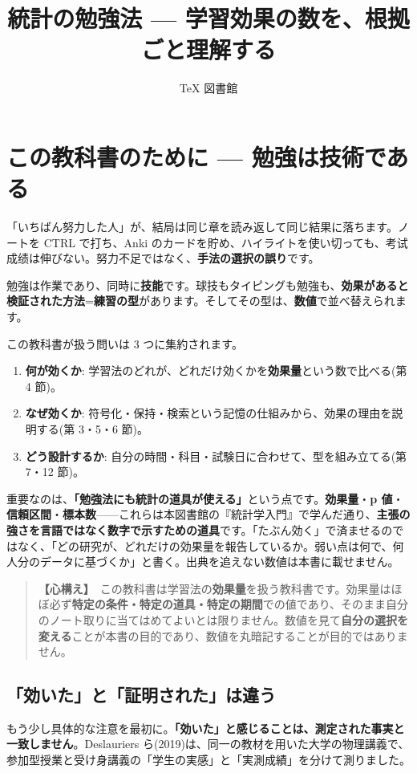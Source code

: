 \documentclass{article}
\title{統計の勉強法 — 学習効果の数を、根拠ごと理解する}
\author{TeX 図書館}
\begin{document}
\section{この教科書のために — 勉強は技術である}

「いちばん努力した人」が、結局は同じ章を読み返して同じ結果に落ちます。ノートを CTRL で打ち、Anki のカードを貯め、ハイライトを使い切っても、考试成绩は伸びない。努力不足ではなく、\textbf{手法の選択の誤り}です。

勉強は作業であり、同時に\textbf{技能}です。球技もタイピングも勉強も、\textbf{効果があると検証された方法}=\textbf{練習の型}があります。そしてその型は、\textbf{数値}で並べ替えられます。

この教科書が扱う問いは 3 つに集約されます。

\begin{enumerate}
\item \textbf{何が効くか}: 学習法のどれが、どれだけ効くかを\textbf{効果量}という数で比べる(第 4 節)。
\item \textbf{なぜ効くか}: 符号化・保持・検索という記憶の仕組みから、効果の理由を説明する(第 3・5・6 節)。
\item \textbf{どう設計するか}: 自分の時間・科目・試験日に合わせて、型を組み立てる(第 7・12 節)。
\end{enumerate}

重要なのは、\textbf{「勉強法にも統計の道具が使える」}という点です。\textbf{効果量}・\textbf{p 値}・\textbf{信頼区間}・\textbf{標本数}——これらは本図書館の『統計学入門』で学んだ通り、\textbf{主張の強さを言語ではなく数字で示すための道具}です。「たぶん効く」で済ませるのではなく、「どの研究が、どれだけの効果量を報告しているか。弱い点は何で、何人分のデータに基づくか」と書く。出典を追えない数値は本書に載せません。

\begin{quote}
\textbf{【心構え】}\ この教科書は学習法の\textbf{効果量}を扱う教科書です。効果量はほぼ必ず\textbf{特定の条件・特定の道具・特定の期間}での値であり、そのまま自分のノート取りに当てはめてよいとは限りません。数値を見て\textbf{自分の選択を変える}ことが本書の目的であり、数値を丸暗記することが目的ではありません。
\end{quote}

\subsection{「効いた」と「証明された」は違う}

もう少し具体的な注意を最初に。\textbf{「効いた」と感じることは、測定された事実と一致しません}。Deslauriers ら(2019)は、同一の教材を用いた大学の物理講義で、参加型授業と受け身講義の「学生の実感」と「実測成績」を分けて測りました。
\end{document}
